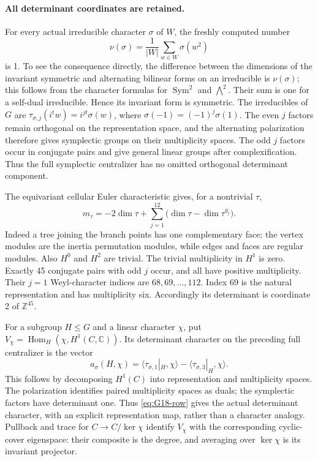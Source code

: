\paragraph{All determinant coordinates are retained.}
For every actual irreducible character \(\sigma\) of \(W\), the freshly
computed number
\[
 \nu(\sigma)=\frac1{|W|}\sum_{w\in W}\sigma(w^2)
\]
is 1. To see the consequence directly, the difference between the
dimensions of the invariant symmetric and alternating bilinear forms
on an irreducible is \(\nu(\sigma)\); this follows from the character
formulas for \(\operatorname{Sym}^2\) and \(\bigwedge^2\).
Their sum is one for a self-dual irreducible. Hence its invariant form
is symmetric. The irreducibles of \(G\) are
\(\tau_{\sigma,j}(i^tw)=i^{jt}\sigma(w)\), where
\(\sigma(-1)=(-1)^j\sigma(1)\). The even \(j\) factors remain
orthogonal on the representation space, and the alternating polarization
therefore gives symplectic groups on their multiplicity spaces. The
odd \(j\) factors occur in conjugate pairs and give general linear
groups after complexification. Thus the full symplectic centralizer
has no omitted orthogonal determinant component.

The equivariant cellular Euler characteristic gives, for a nontrivial
\(\tau\),
\[
 m_\tau=-2\dim\tau+
       \sum_{j=1}^{12}\bigl(\dim\tau-\dim\tau^{g_j}\bigr).
\]
Indeed a tree joining the branch points has one complementary face;
the vertex modules are the inertia permutation modules, while edges
and faces are regular modules. Also \(H^0\) and \(H^2\) are trivial.
The trivial multiplicity in \(H^1\) is zero.
Exactly 45 conjugate pairs with odd \(j\) occur, and all have positive
multiplicity. Their \(j=1\) Weyl-character indices are
\(68,69,\ldots,112\). Index 69 is the natural representation and has
multiplicity six. Accordingly its determinant is coordinate 2 of
\(\mathbb Z^{45}\).

For a subgroup \(H\leq G\) and a linear character \(\chi\), put
\(V_\chi=\operatorname{Hom}_H(\chi,H^1(C,\mathbb C))\). Its
determinant character on the preceding full centralizer is the vector
\begin{equation}\label{eq:G18-row}
 a_\sigma(H,\chi)=
 \langle\tau_{\sigma,1}|_H,\chi\rangle
 -\langle\tau_{\sigma,3}|_H,\chi\rangle.
\end{equation}
This follows by decomposing \(H^1(C)\) into representation and
multiplicity spaces. The polarization identifies paired multiplicity
spaces as duals; the symplectic factors have determinant one.
Thus \eqref{eq:G18-row} gives the actual determinant character,
with an explicit representation map, rather than a character analogy.
Pullback and trace for \(C\to C/\ker\chi\) identify \(V_\chi\)
with the corresponding cyclic-cover eigenspace: their composite is
the degree, and averaging over \(\ker\chi\) is its invariant projector.

